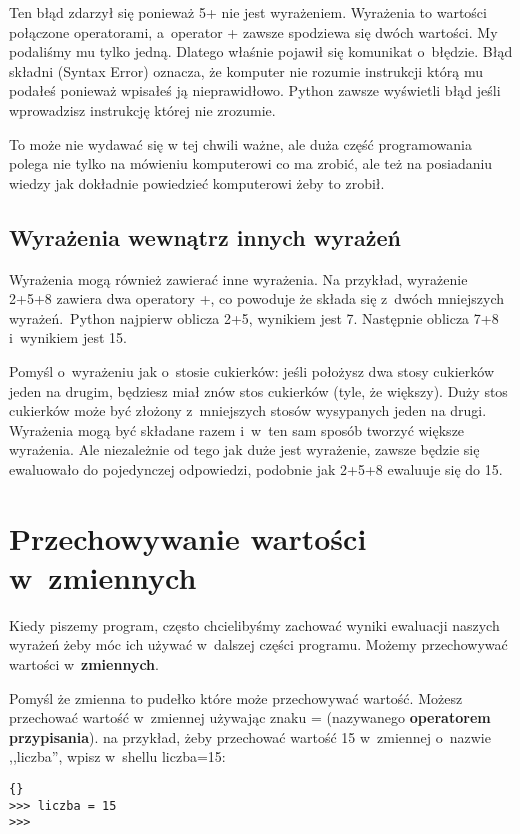 \documentclass{book}
\begin{document}
Ten błąd zdarzył się ponieważ 5+ nie jest wyrażeniem. Wyrażenia to wartości połączone operatorami, a~operator + zawsze spodziewa się dwóch wartości. My podaliśmy mu tylko jedną. Dlatego właśnie pojawił się komunikat o~błędzie. Błąd składni (Syntax Error) oznacza, że komputer nie rozumie instrukcji którą mu podałeś ponieważ wpisałeś ją nieprawidłowo. Python zawsze wyświetli błąd jeśli wprowadzisz instrukcję której nie zrozumie.

To może nie wydawać się w tej chwili ważne, ale duża część programowania polega nie tylko na mówieniu komputerowi co ma zrobić, ale też na posiadaniu wiedzy jak dokładnie powiedzieć komputerowi żeby to zrobił.

\subsection{Wyrażenia wewnątrz innych wyrażeń}

Wyrażenia mogą również zawierać inne wyrażenia. Na przykład, wyrażenie 2+5+8 zawiera dwa operatory +, co powoduje że składa się z~dwóch mniejszych wyrażeń.~Python najpierw oblicza 2+5, wynikiem jest 7. Następnie oblicza 7+8 i~wynikiem jest 15.

Pomyśl o~wyrażeniu jak o~stosie cukierków: jeśli położysz dwa stosy cukierków jeden na drugim, będziesz miał znów stos cukierków (tyle, że większy). Duży stos cukierków może być złożony z~mniejszych stosów wysypanych jeden na drugi. Wyrażenia mogą być składane razem i~w~ten sam sposób tworzyć większe wyrażenia. Ale niezależnie od tego jak duże jest wyrażenie, zawsze będzie się ewaluowało do pojedynczej odpowiedzi, podobnie jak 2+5+8 ewaluuje się do 15.

\section{Przechowywanie wartości w~zmiennych}

Kiedy piszemy program, często chcielibyśmy zachować wyniki ewaluacji naszych wyrażeń żeby móc ich używać w~dalszej części programu. Możemy przechowywać wartości w~{\bf zmiennych}.

Pomyśl że zmienna to pudełko które może przechowywać wartość. Możesz przechować wartość w~zmiennej używając znaku = (nazywanego {\bf operatorem przypisania}). na przykład, żeby przechować wartość 15 w~zmiennej o~nazwie ,,liczba'', wpisz w~shellu liczba=15:

\lstset{language=python}
\begin{lstlisting}{}
>>> liczba = 15
>>>
\end{lstlisting}
\end{document}
